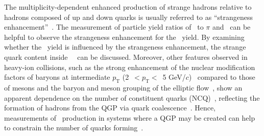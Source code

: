 The multiplicity-dependent enhanced production of strange hadrons relative to hadrons composed of up and down quarks is usually referred to as ``strangeness enhancement''~\cite{ALICE:2016fzo}. The measurement of particle yield ratios of \fzero~to $\pi$ and \kstar~can be helpful to observe the strangeness enhancement for the \fzero~yield. By examining whether the \fzero~yield is influenced by the strangeness enhancement, the strange quark content inside \fzero~\cite{LHCb:2014ooi, LHCb:2014vbo}~can be discussed. Moreover, other features observed in heavy-ion collisions, such as the strong enhancement of the nuclear modification factors of baryons at intermediate $p_{\mathrm{T}}$ (2~$<p_{\mathrm{T}}<$~5 GeV/$c$)~\cite{Fries:2003vb, ALICE:2022wpn} compared to those of mesons and the baryon and meson grouping of the elliptic flow~\cite{Wang:2022det}, show an apparent dependence on the number of constituent quarks (NCQ)~\cite{Wang:2022det}, reflecting the formation of hadrons from the QGP via quark coalescence~\cite{Fries:2003vb}. Hence, measurements of \fzero~production in systems where a QGP may be created can help to constrain the number of quarks forming~\fzero.

